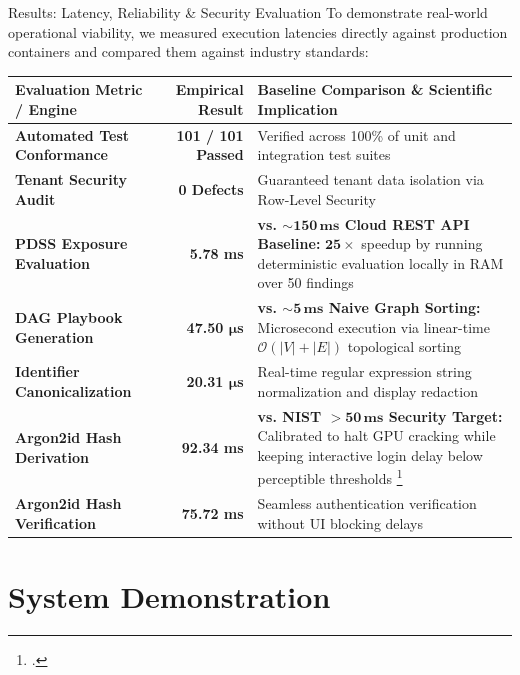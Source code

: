 \documentclass[aspectratio=169,10pt]{beamer}
\begin{document}
\begin{frame}{Results: Latency, Reliability \& Security Evaluation}
  \small
  To demonstrate real-world operational viability, we measured execution latencies directly against production containers and compared them against industry standards:
  
  \vspace{0.15cm}
  \begin{table}
    \centering
    \scriptsize
    \begin{tabular}{l r >{\raggedright\arraybackslash}p{5.8cm}}
      \toprule
      \textbf{Evaluation Metric / Engine} & \textbf{Empirical Result} & \textbf{Baseline Comparison \& Scientific Implication} \\
      \midrule
      \textbf{Automated Test Conformance} & \textbf{101 / 101 Passed} & Verified across 100\% of unit and integration test suites \\
      \textbf{Tenant Security Audit} & \textbf{0 Defects} & Guaranteed tenant data isolation via Row-Level Security \\
      \textbf{PDSS Exposure Evaluation} & \textbf{5.78 ms} & \textbf{vs. $\mathbf{\sim 150\,\text{ms}}$ Cloud REST API Baseline:} $\mathbf{25\times}$ speedup by running deterministic evaluation locally in RAM over 50 findings \\
      \textbf{DAG Playbook Generation} & \textbf{47.50 $\boldsymbol{\mu}$s} & \textbf{vs. $\mathbf{\sim 5\,\text{ms}}$ Naive Graph Sorting:} Microsecond execution via linear-time $\mathcal{O}(|V|+|E|)$ topological sorting \\
      \textbf{Identifier Canonicalization} & \textbf{20.31 $\boldsymbol{\mu}$s} & Real-time regular expression string normalization and display redaction \\
      \textbf{Argon2id Hash Derivation} & \textbf{92.34 ms} & \textbf{vs. NIST $\mathbf{>50\,\text{ms}}$ Security Target:} Calibrated to halt GPU cracking while keeping interactive login delay below perceptible thresholds \footcite{RFC9106_Argon2} \\
      \textbf{Argon2id Hash Verification} & \textbf{75.72 ms} & Seamless authentication verification without UI blocking delays \\
      \bottomrule
    \end{tabular}
  \end{table}
\end{frame}

\section{System Demonstration}
\end{document}
